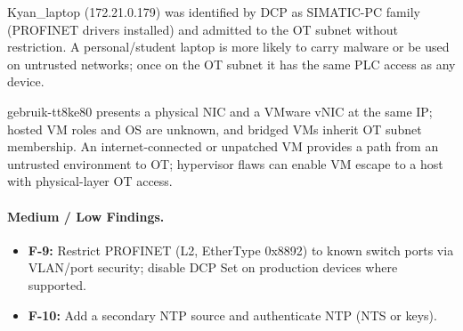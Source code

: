 \documentclass[11pt,a4paper]{article}
\begin{document}
{Kyan\_laptop (172.21.0.179) was identified by DCP as SIMATIC-PC family (PROFINET drivers installed) and admitted to the OT subnet without restriction.}
{A personal/student laptop is more likely to carry malware or be used on untrusted networks; once on the OT subnet it has the same PLC access as any device.}

{gebruik-tt8ke80 presents a physical NIC and a VMware vNIC at the same IP; hosted VM roles and OS are unknown, and bridged VMs inherit OT subnet membership.}
{An internet-connected or unpatched VM provides a path from an untrusted environment to OT; hypervisor flaws can enable VM escape to a host with physical-layer OT access.}

\paragraph{Medium / Low Findings.}
\begin{itemize}[nosep]
  \item \textbf{F-9:} Restrict PROFINET (L2, EtherType 0x8892) to known switch ports via VLAN/port security; disable DCP Set on production devices where supported.
  \item \textbf{F-10:} Add a secondary NTP source and authenticate NTP (NTS or keys).
\end{itemize}

\pagebreak
\end{document}
